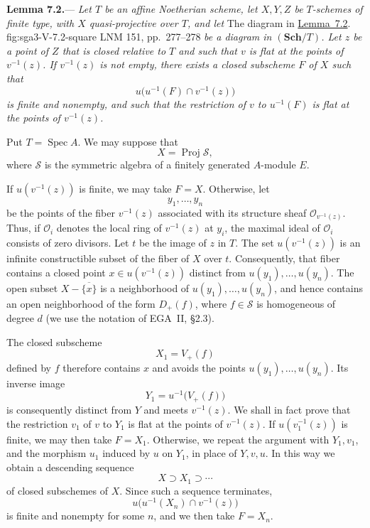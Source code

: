 
\medskip
{}\label{lem:sga3-V-7.2}%
\noindent\textbf{Lemma 7.2.}---%
\emph{Let \(T\) be an affine Noetherian scheme, let \(X,Y,Z\) be
\(T\)-schemes of finite type, with \(X\) quasi-projective over \(T\),
and let}
  {The diagram in \hyperref[lem:sga3-V-7.2]{Lemma~7.2}.}
  {fig:sga3-V-7.2-square}
  {LNM 151, pp.~277--278}
\emph{be a diagram in \((\mathbf{Sch}/T)\). Let \(z\) be a point of
\(Z\) that is closed relative to \(T\) and such that \(v\) is
flat at the points of \(v^{-1}(z)\). If \(v^{-1}(z)\) is not empty, there
exists a closed subscheme \(F\) of \(X\) such that
\[
  u\bigl(u^{-1}(F)\cap v^{-1}(z)\bigr)
\]
is finite and nonempty, and such that the restriction of \(v\) to
\(u^{-1}(F)\) is flat at the points of \(v^{-1}(z)\).}

Put \(T=\operatorname{Spec}A\). We may suppose that
\[
  X=\operatorname{Proj}\mathscr S,
\]
where \(\mathscr S\) is the symmetric algebra of a finitely generated
\(A\)-module \(E\).

If \(u(v^{-1}(z))\) is finite, we may take \(F=X\). Otherwise, let
\[
  y_1,\ldots,y_n
\]
be the points of the fiber \(v^{-1}(z)\) associated with its
structure sheaf \(\mathcal O_{v^{-1}(z)}\). Thus, if
\(\mathcal O_i\) denotes the local ring of \(v^{-1}(z)\) at \(y_i\),
the maximal ideal of \(\mathcal O_i\) consists of zero divisors. Let
\(t\) be the image of \(z\) in \(T\). The set \(u(v^{-1}(z))\) is an
infinite constructible subset of the fiber of \(X\) over \(t\).
Consequently, that fiber contains a closed point
\(x\in u(v^{-1}(z))\) distinct from
\(u(y_1),\ldots,u(y_n)\). The open subset
\(X-\overline{\{x\}}\) is a neighborhood of \(u(y_1),\ldots,u(y_n)\), and hence
contains an open neighborhood of the form \(D_+(f)\), where
\(f\in\mathscr S\) is homogeneous of degree \(d\) (we use the
notation of EGA~II, \S2.3).

The closed subscheme
\[
  X_1=V_+(f)
\]
defined by \(f\) therefore contains \(x\) and avoids the points
\(u(y_1),\ldots,u(y_n)\). Its inverse image
\[
  Y_1=u^{-1}\bigl(V_+(f)\bigr)
\]
is consequently distinct from \(Y\) and meets \(v^{-1}(z)\). We
shall in fact prove that the restriction \(v_1\) of \(v\) to \(Y_1\)
is flat at the points of \(v^{-1}(z)\). If
\(u(v_1^{-1}(z))\) is finite, we may then take \(F=X_1\). Otherwise,
we repeat the argument with \(Y_1,v_1\), and the morphism \(u_1\)
induced by \(u\) on \(Y_1\), in place of \(Y,v,u\). In this way we
obtain a descending sequence
\[
  X\supset X_1\supset\cdots
\]
of closed subschemes of \(X\). Since such a sequence terminates,
\[
  u\bigl(u^{-1}(X_n)\cap v^{-1}(z)\bigr)
\]
is finite and nonempty for some \(n\), and we then take \(F=X_n\).

